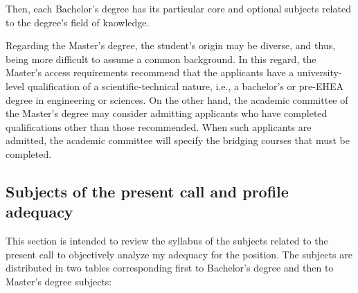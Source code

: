 \documentclass{article}
\begin{document}
Then, each Bachelor's degree has its particular core and optional subjects related to the degree's field of knowledge. 

Regarding the Master's degree, the student's origin may be diverse, and thus, being more difficult to assume a common background. In this regard, the Master's access requirements recommend that the applicants have a university-level qualification of a scientific-technical nature, i.e., a bachelor's or pre-EHEA degree in engineering or sciences. On the other hand, the academic committee of the Master's degree may consider admitting applicants who have completed qualifications other than those recommended. When such applicants are admitted, the academic committee will specify the bridging courses that must be completed.  

\subsection{Subjects of the present call and profile adequacy}

This section is intended to review the syllabus of the subjects related to the present call to objectively analyze my adequacy for the position. The subjects are distributed in two tables corresponding first to Bachelor's degree and then to Master's degree subjects:
\end{document}
